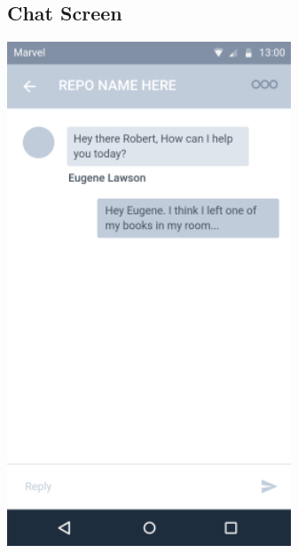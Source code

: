 \documentclass{report}
\begin{document}
\subsection{Chat Screen}
\begin{center}
    \includegraphics[scale=0.6]{design-chat}
\end{center}

\newpage
\end{document}
